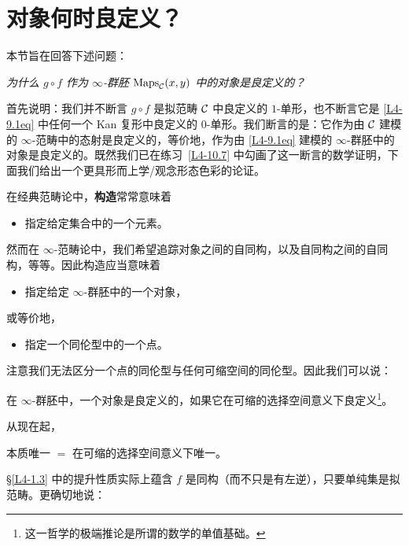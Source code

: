 \section{对象何时良定义？}

\nitem\label{L4-11.1} 本节旨在回答下述问题：
\begin{center}
\emph{为什么 $g\circ f$ 作为 $\infty$-群胚 $\mathrm{Maps}_{\mathcal{C}}(x,y)$ 中的对象是良定义的？}
\end{center}

\nitem\label{L4-11.2} 首先说明：我们并不断言 $g\circ f$ 是拟范畴 $\mathcal{C}$ 中良定义的 $1$-单形，也不断言它是 \eqref{L4-9.1eq} 中任何一个 Kan 复形中良定义的 $0$-单形。我们断言的是：它作为由 $\mathcal{C}$ 建模的 $\infty$-范畴中的态射是良定义的，等价地，作为由 \eqref{L4-9.1eq} 建模的 $\infty$-群胚中的对象是良定义的。既然我们已在练习~\ref{L4-10.7} 中勾画了这一断言的数学证明，下面我们给出一个更具形而上学/观念形态色彩的论证。

\nitem\label{L4-11.3} 在经典范畴论中，\textbf{构造}常常意味着
\begin{itemize}[leftmargin=2.2em,itemsep=0.1em]
\item 指定给定集合中的一个元素。
\end{itemize}
然而在 $\infty$-范畴论中，我们希望追踪对象之间的自同构，以及自同构之间的自同构，等等。因此构造应当意味着
\begin{itemize}[leftmargin=2.2em,itemsep=0.1em]
\item 指定给定 $\infty$-群胚中的一个对象，
\end{itemize}
或等价地，
\begin{itemize}[leftmargin=2.2em,itemsep=0.1em]
\item 指定一个同伦型中的一个点。
\end{itemize}
注意我们无法区分一个点的同伦型与任何可缩空间的同伦型。因此我们可以说：

\begin{slogan}\label{L4-11.4}\centering\par
在 $\infty$-群胚中，一个对象是良定义的，如果它在可缩的选择空间意义下良定义\footnote{这一哲学的极端推论是所谓的数学的单值基础。}。
\end{slogan}

\nitem\label{L4-11.5} 从现在起，
\begin{center}
本质唯一 $=$ 在可缩的选择空间意义下唯一。
\end{center}


\nitem\label{L4-A.1} \S\ref{L4-1.3} 中的提升性质实际上蕴含 $f$ 是同构（而不只是有左逆），只要单纯集是拟范畴。更确切地说：

